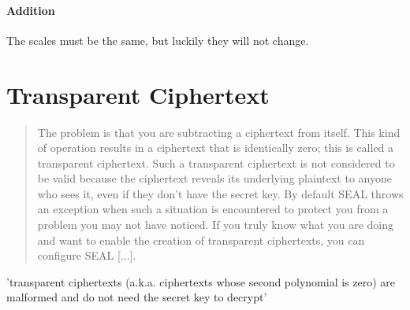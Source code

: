 \paragraph{Addition}
The scales must be the same, but luckily they will not change.

\section{Transparent Ciphertext}
\begin{quote}
  The problem is that you are subtracting a ciphertext from itself.
  This kind of operation results in a ciphertext that is identically zero;
  this is called a transparent ciphertext. Such a transparent ciphertext
  is not considered to be valid because the ciphertext reveals its underlying plaintext to anyone who sees it,
  even if they don't have the secret key.
  By default SEAL throws an exception when such a situation is encountered to protect you from a problem you may not have noticed.
  If you truly know what you are doing and want to enable the creation of transparent ciphertexts,
  you can configure SEAL [...].
  \parencite{kim-laine-on-transparent-ciphertexts}
\end{quote}

'transparent ciphertexts (a.k.a. ciphertexts whose second polynomial is zero) are malformed and do not need the secret key to decrypt'
